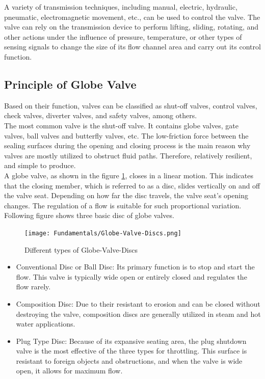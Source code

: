 A variety of transmission techniques, including manual, electric, hydraulic, pneumatic, 
electromagnetic movement, etc., can be used to control the valve. The valve can rely on the 
transmission device to perform lifting, sliding, rotating, and other actions under the influence of pressure, 
temperature, or other types of sensing signals to change the size of its flow channel area and carry out 
its control function.


\subsection{Principle of Globe Valve}
\label{sec:PrincipleofGlobeValve}

Based on their function, valves can be classified as shut-off valves, control valves, 
check valves, diverter valves, and safety valves, among others.\\

The most common valve is the shut-off valve. It contains globe valves, gate valves, 
ball valves and butterfly valves, etc. The low-friction force between the sealing surfaces 
during the opening and closing process is the main reason why valves are mostly utilized to 
obstruct fluid paths. Therefore, relatively resilient, and simple to produce.\\

A globe valve, as shown in the figure \ref*{fig:discs}, closes in a linear motion. This indicates that the closing member, 
which is referred to as a disc, slides vertically on and off the valve seat. Depending on how far the disc travels, 
the valve seat's opening changes. The regulation of a flow is suitable for such proportional variation. 
Following figure shows three basic disc of globe valves.\\

\begin{figure}[htbp]
    \centering
    \texttt{[image: Fundamentals/Globe-Valve-Discs.png]}
    \caption{Different types of Globe-Valve-Discs \cite{discs}}
    \label{fig:discs}
\end{figure}

\begin{itemize}
    \item Conventional Disc or Ball Disc: Its primary function is to stop and start the flow. This valve is typically wide open or entirely closed and regulates the flow rarely.
    \item Composition Disc: Due to their resistant to erosion and can be closed without destroying the valve, composition discs are generally utilized in steam and hot water applications.
    \item Plug Type Disc: Because of its expansive seating area, the plug shutdown valve is the most effective of the three types for throttling. This surface is resistant to foreign objects and obstructions, and when the valve is wide open, it allows for maximum flow.
\end{itemize}

